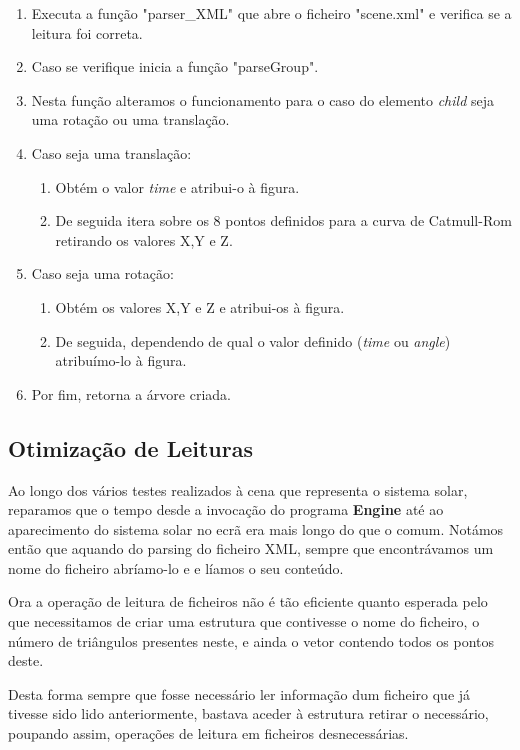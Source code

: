 \documentclass[a4paper]{article}
\begin{document}
\ttfamily
\begin{enumerate}
  \item Executa a função "parser\_XML" que abre o ficheiro "scene.xml" e verifica se a leitura foi correta.
  \item Caso se verifique inicia a função "parseGroup".
  \item Nesta função alteramos o funcionamento para o caso do elemento \textit{child} seja uma rotação ou uma translação.
  \item Caso seja uma translação:
  \begin{enumerate}
    \item Obtém o valor \textit{time} e atribui-o à figura.
    \item De seguida itera sobre os 8 pontos definidos para a curva de Catmull-Rom retirando os valores X,Y e Z.
  \end{enumerate}
  \item Caso seja uma rotação:
  \begin{enumerate}
    \item Obtém os valores X,Y e Z e atribui-os à figura.
    \item De seguida, dependendo de qual o valor definido (\textit{time} ou \textit{angle}) atribuímo-lo à figura.
  \end{enumerate}
  \item Por fim, retorna a árvore criada.
\end{enumerate}
\rmfamily

\subsection{Otimização de Leituras}
\label{sec:otimização}

Ao longo dos vários testes realizados à cena que representa o sistema solar, reparamos que o tempo desde a invocação do programa \textbf{Engine} até ao aparecimento do sistema solar no ecrã era mais longo do que o comum. Notámos então que aquando do parsing do ficheiro XML, sempre que encontrávamos um nome do ficheiro abríamo-lo e e líamos o seu conteúdo. 

Ora a operação de leitura de ficheiros não é tão eficiente quanto esperada pelo que necessitamos de criar uma estrutura que contivesse o nome do ficheiro, o número de triângulos presentes neste, e ainda o vetor contendo todos os pontos deste.

Desta forma sempre que fosse necessário ler informação dum ficheiro que já tivesse sido lido anteriormente, bastava aceder à estrutura retirar o necessário, poupando assim, operações de leitura em ficheiros desnecessárias.
\end{document}
